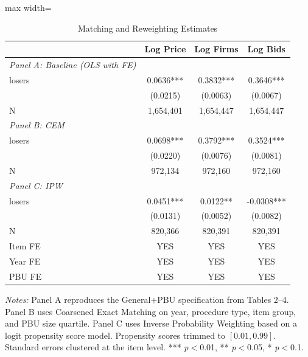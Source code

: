 \begin{table}[htbp]
\centering
\caption{Matching and Reweighting Estimates}
\label{tab:matching}
\begin{adjustbox}{max width=\textwidth}
\begin{threeparttable}
\small
\begin{tabular}{lccc}
\toprule
 & Log Price & Log Firms & Log Bids \\
\midrule
\textit{Panel A: Baseline (OLS with FE)} & & & \\
\quad losers & 0.0636*** & 0.3832*** & 0.3646*** \\
\quad & (0.0215) & (0.0063) & (0.0067) \\
\quad N & 1,654,401 & 1,654,447 & 1,654,447 \\
[6pt]
\textit{Panel B: CEM} & & & \\
\quad losers & 0.0698*** & 0.3792*** & 0.3524*** \\
\quad & (0.0220) & (0.0076) & (0.0081) \\
\quad N & 972,134 & 972,160 & 972,160 \\
[6pt]
\textit{Panel C: IPW} & & & \\
\quad losers & 0.0451*** & 0.0122** & -0.0308*** \\
\quad & (0.0131) & (0.0052) & (0.0082) \\
\quad N & 820,366 & 820,391 & 820,391 \\
\midrule
Item FE & YES & YES & YES \\
Year FE & YES & YES & YES \\
PBU FE & YES & YES & YES \\
\bottomrule
\end{tabular}
\begin{tablenotes}
\small
\item \textit{Notes:} Panel A reproduces the General+PBU specification from Tables 2--4.
Panel B uses Coarsened Exact Matching on year, procedure type, item group, and PBU size quartile.
Panel C uses Inverse Probability Weighting based on a logit propensity score model.
Propensity scores trimmed to $[0.01, 0.99]$. Standard errors clustered at the item level.
*** \textit{p}$<$0.01, ** \textit{p}$<$0.05, * \textit{p}$<$0.1.
\end{tablenotes}
\end{threeparttable}
\end{adjustbox}
\end{table}
